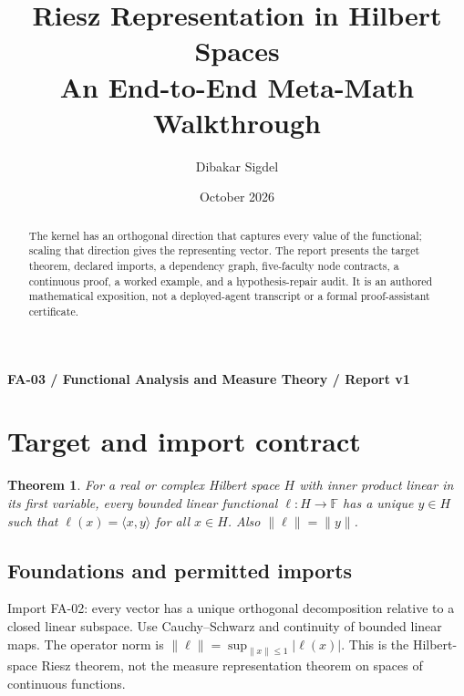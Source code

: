 \documentclass[preprint,12pt,aps,pra,showkeys,amsmath,amssymb,superscriptaddress,floatfix]{revtex4-2}
\newtheorem{theorem}{Theorem}[section]
\theoremstyle{definition}
\theoremstyle{remark}
\begin{document}
\title{Riesz Representation in Hilbert Spaces\\[4pt]\large An End-to-End Meta-Math Walkthrough}

\author{Dibakar Sigdel}


\date{October 2026}

\begin{abstract}

The kernel has an orthogonal direction that captures every value of the
functional; scaling that direction gives the representing vector. The
report presents the target theorem, declared imports, a dependency
graph, five-faculty node contracts, a continuous proof, a worked
example, and a hypothesis-repair audit. It is an authored mathematical
exposition, not a deployed-agent transcript or a formal proof-assistant
certificate.

\end{abstract}\maketitle\linespread{1.12}\selectfont

\noindent\textbf{FA-03 / Functional Analysis and Measure Theory / Report v1}

\section{Target and import contract}

\begin{theorem}

For a real or complex Hilbert space \(H\) with inner product linear in
its first variable, every bounded linear functional
\(\ell:H\to\mathbb F\) has a unique \(y\in H\) such that
\(\ell(x)=\langle x,y\rangle\) for all \(x\in H\). Also
\(\|\ell\|=\|y\|\).

\end{theorem}

\subsection{Foundations and permitted imports}

Import FA-02: every vector has a unique orthogonal decomposition
relative to a closed linear subspace. Use Cauchy--Schwarz and continuity
of bounded linear maps. The operator norm is
\(\|\ell\|=\sup_{\|x\|\le1}|\ell(x)|\). This is the Hilbert-space Riesz
theorem, not the measure representation theorem on spaces of continuous
functions.
\end{document}
